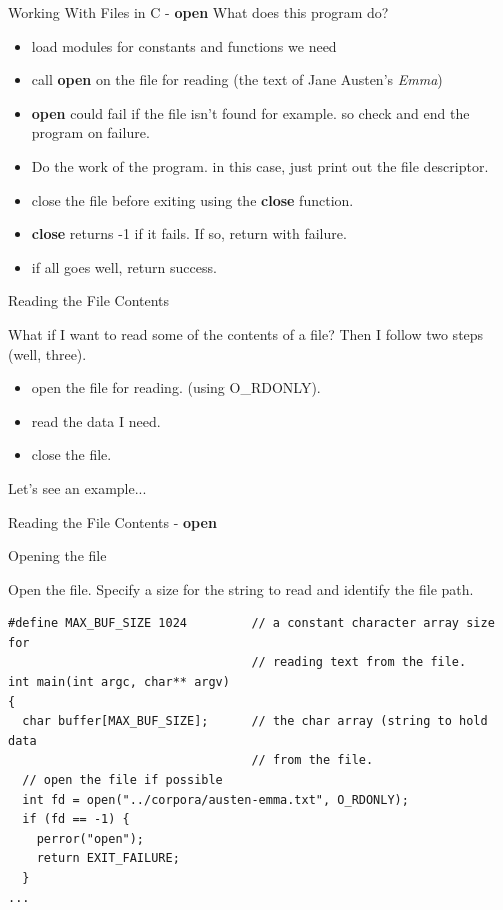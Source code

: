 \documentclass[10pt]{beamer}
\begin{document}
\begin{frame}[fragile]{Working With Files in C - \textbf{open}}
What does this program do?

\begin{itemize}
\item load modules for constants and functions we need
\item call \textbf{open} on the file for reading (the text of Jane Austen's \textit{Emma})
\item \textbf{open} could fail if the file isn't found for example.  so check and end the program on failure.
\item Do the work of the program.  in this case, just print out the file descriptor.
\item close the file before exiting using the \textbf{close} function. 
\item \textbf{close} returns -1 if it fails. If so, return with failure.
\item if all goes well, return success.
\end{itemize}


\end{frame}
\begin{frame}[fragile]{Reading the File Contents}

What if I want to read some of the contents of a file?  Then I follow two steps (well, three).

\begin{itemize}
\item open the file for reading. (using O\_RDONLY).
\item read the data I need.
\item close the file.
\end{itemize}

Let's see an example...

\end{frame}
\begin{frame}[fragile]{Reading the File Contents - \textbf{open}}

Opening the file

Open the file.  Specify a size for the string to read and identify the file path.

\begin{verbatim}
#define MAX_BUF_SIZE 1024         // a constant character array size for
                                  // reading text from the file.
int main(int argc, char** argv)
{
  char buffer[MAX_BUF_SIZE];      // the char array (string to hold data
                                  // from the file.
  // open the file if possible
  int fd = open("../corpora/austen-emma.txt", O_RDONLY);
  if (fd == -1) {
    perror("open");
    return EXIT_FAILURE;
  }
...

\end{verbatim}

\end{frame}
\end{document}
